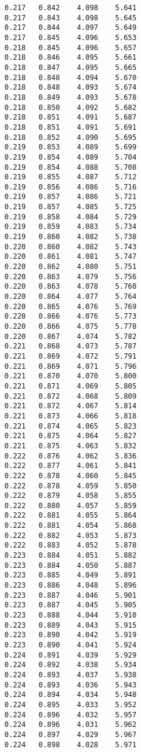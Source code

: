 \begin{verbatim}
   0.217   0.842    4.098    5.641
   0.217   0.843    4.098    5.645
   0.217   0.844    4.097    5.649
   0.217   0.845    4.096    5.653
   0.218   0.845    4.096    5.657
   0.218   0.846    4.095    5.661
   0.218   0.847    4.095    5.665
   0.218   0.848    4.094    5.670
   0.218   0.848    4.093    5.674
   0.218   0.849    4.093    5.678
   0.218   0.850    4.092    5.682
   0.218   0.851    4.091    5.687
   0.218   0.851    4.091    5.691
   0.218   0.852    4.090    5.695
   0.219   0.853    4.089    5.699
   0.219   0.854    4.089    5.704
   0.219   0.854    4.088    5.708
   0.219   0.855    4.087    5.712
   0.219   0.856    4.086    5.716
   0.219   0.857    4.086    5.721
   0.219   0.857    4.085    5.725
   0.219   0.858    4.084    5.729
   0.219   0.859    4.083    5.734
   0.219   0.860    4.082    5.738
   0.220   0.860    4.082    5.743
   0.220   0.861    4.081    5.747
   0.220   0.862    4.080    5.751
   0.220   0.863    4.079    5.756
   0.220   0.863    4.078    5.760
   0.220   0.864    4.077    5.764
   0.220   0.865    4.076    5.769
   0.220   0.866    4.076    5.773
   0.220   0.866    4.075    5.778
   0.220   0.867    4.074    5.782
   0.221   0.868    4.073    5.787
   0.221   0.869    4.072    5.791
   0.221   0.869    4.071    5.796
   0.221   0.870    4.070    5.800
   0.221   0.871    4.069    5.805
   0.221   0.872    4.068    5.809
   0.221   0.872    4.067    5.814
   0.221   0.873    4.066    5.818
   0.221   0.874    4.065    5.823
   0.221   0.875    4.064    5.827
   0.221   0.875    4.063    5.832
   0.222   0.876    4.062    5.836
   0.222   0.877    4.061    5.841
   0.222   0.878    4.060    5.845
   0.222   0.878    4.059    5.850
   0.222   0.879    4.058    5.855
   0.222   0.880    4.057    5.859
   0.222   0.881    4.055    5.864
   0.222   0.881    4.054    5.868
   0.222   0.882    4.053    5.873
   0.222   0.883    4.052    5.878
   0.223   0.884    4.051    5.882
   0.223   0.884    4.050    5.887
   0.223   0.885    4.049    5.891
   0.223   0.886    4.048    5.896
   0.223   0.887    4.046    5.901
   0.223   0.887    4.045    5.905
   0.223   0.888    4.044    5.910
   0.223   0.889    4.043    5.915
   0.223   0.890    4.042    5.919
   0.223   0.890    4.041    5.924
   0.224   0.891    4.039    5.929
   0.224   0.892    4.038    5.934
   0.224   0.893    4.037    5.938
   0.224   0.893    4.036    5.943
   0.224   0.894    4.034    5.948
   0.224   0.895    4.033    5.952
   0.224   0.896    4.032    5.957
   0.224   0.896    4.031    5.962
   0.224   0.897    4.029    5.967
   0.224   0.898    4.028    5.971

\end{verbatim}
